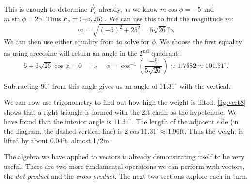 \begin{example}
This is enough to determine $\vec F_c$ already, as we know $m\cos \phi = -5$ and $m\sin\phi =25$. Thus $F_c =\left\langle -5,25\right\rangle.$ We can use this to find the magnitude $m$:
\[m = \sqrt{(-5)^2+25^2} = 5\sqrt{26}%
\text{lb}.\]
We can then use either equality from  to solve for $\phi$. We choose the first equality as using arccosine will return an angle in the 2\textsuperscript{nd} quadrant:
\[5 + 5\sqrt{26}\cos \phi = 0 \quad \Rightarrow \quad \phi = \cos^{-1}\left(\frac{-5}{5\sqrt{26}}\right) \approx 1.7682\approx 101.31^\circ.\]

Subtracting $90^\circ$ from this angle gives us an angle of $11.31^\circ$ with the vertical.

We can now use trigonometry to find out how high the weight is lifted. \autoref{fig:vect8} shows that a right triangle is formed with the 2ft chain as the hypotenuse.  We have found that the interior angle is $11.31^\circ$. The length of the adjacent side (in the diagram, the dashed vertical line) is $2\cos 11.31^\circ \approx 1.96$ft. Thus the weight is lifted by about $0.04$ft, almost 1/2in.
\end{example}

The algebra we have applied to vectors is already demonstrating itself to be very useful. There are two more fundamental operations we can perform with vectors, the \emph{dot product} and the \emph{cross product}. The next two sections explore each in turn.

